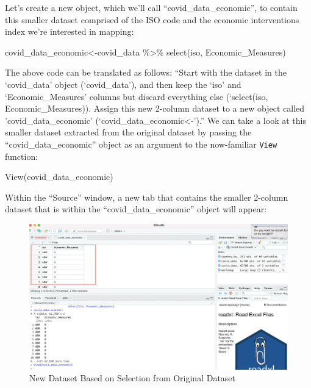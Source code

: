 \documentclass[
]{article}
\newenvironment{Shaded}{\begin{snugshade}}{\end{snugshade}}
\newcommand{\FunctionTok}[1]{\textcolor[rgb]{0.00,0.00,0.00}{#1}}
\newcommand{\NormalTok}[1]{#1}
\newcommand{\OtherTok}[1]{\textcolor[rgb]{0.56,0.35,0.01}{#1}}
\newcommand{\SpecialCharTok}[1]{\textcolor[rgb]{0.00,0.00,0.00}{#1}}
\begin{document}
Let's create a new object, which we'll call ``covid\_data\_economic'', to contain this smaller dataset comprised of the ISO code and the economic interventions index we're interested in mapping:

\begin{Shaded}
\begin{Highlighting}[]
\NormalTok{covid\_data\_economic}\OtherTok{\textless{}{-}}\NormalTok{covid\_data }\SpecialCharTok{\%\textgreater{}\%} 
                      \FunctionTok{select}\NormalTok{(iso, Economic\_Measures) }
\end{Highlighting}
\end{Shaded}

The above code can be translated as follows: ``Start with the dataset in the `covid\_data' object (`covid\_data'), and then keep the `iso' and `Economic\_Measures' columns but discard everything else (`select(iso, Economic\_Measures)). Assign this new 2-column dataset to a new object called 'covid\_data\_economic' (`covid\_data\_economic\textless-').'' We can take a look at this smaller dataset extracted from the original dataset by passing the ``covid\_data\_economic'' object as an argument to the now-familiar \texttt{View} function:

\begin{Shaded}
\begin{Highlighting}[]
\FunctionTok{View}\NormalTok{(covid\_data\_economic)}
\end{Highlighting}
\end{Shaded}

Within the ``Source'' window, a new tab that contains the smaller 2-column dataset that is within the ``covid\_data\_economic'' object will appear:

\begin{figure}
\includegraphics[width=1\linewidth]{images/selection} \caption{New Dataset Based on Selection from Original Dataset}\label{fig:unnamed-chunk-30}
\end{figure}
\end{document}
